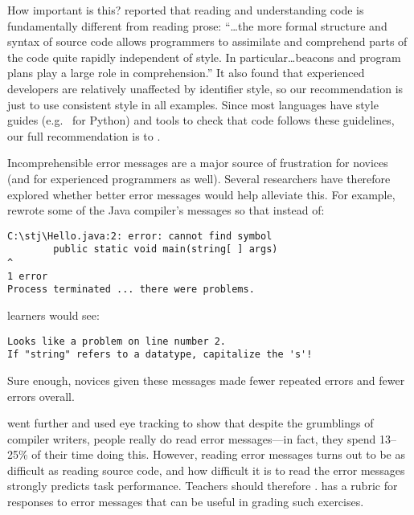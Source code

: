 How important is this?
\cite{Bink2012} reported that reading and understanding code is fundamentally different from reading prose:
``{\ldots}the more formal structure and syntax of source code
allows programmers to assimilate and comprehend parts of the code quite rapidly independent of style.
In particular{\ldots}beacons and program plans play a large role in comprehension.''
It also found that experienced developers are relatively unaffected by identifier style,
so our recommendation is just to use consistent style in all examples.
Since most languages have style guides
(e.g.\  for Python)
and tools to check that code follows these guidelines,
our full recommendation is to
.


Incomprehensible error messages are a major source of frustration for novices
(and for experienced programmers as well).
Several researchers have therefore explored whether better error messages would help alleviate this.
For example,
\cite{Beck2016} rewrote some of the Java compiler's messages so that instead of:

\begin{verbatim}
C:\stj\Hello.java:2: error: cannot find symbol
        public static void main(string[ ] args)
^
1 error
Process terminated ... there were problems.
\end{verbatim}

\noindent
learners would see:

\begin{verbatim}
Looks like a problem on line number 2.
If "string" refers to a datatype, capitalize the 's'!
\end{verbatim}

\noindent
Sure enough,
novices given these messages made fewer repeated errors and fewer errors overall.

\cite{Bari2017} went further and used eye tracking to show that
despite the grumblings of compiler writers,
people really do read error messages---in fact, they spend 13--25\% of their time doing this.
However,
reading error messages turns out to be as difficult as reading source code,
and how difficult it is to read the error messages strongly predicts task performance.
Teachers should therefore
.
\cite{Marc2011} has a rubric for responses to error messages that can be useful in grading such exercises.

